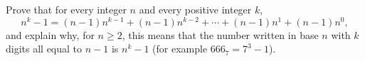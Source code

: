 Prove that for every integer $n$ and every positive integer $k$,
\[
n^k-1=(n-1)n^{k-1}+(n-1)n^{k-2}+\cdots+(n-1)n^{1}+(n-1)n^{0},
\]
and explain why, for $n\ge2$, this means that the number written in base $n$ with $k$ digits all equal to $n-1$ is $n^k-1$ (for example $666_7=7^3-1$).
